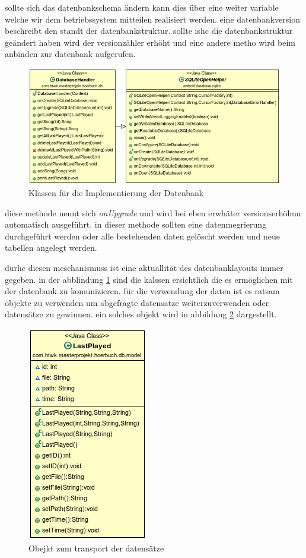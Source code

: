 sollte sich das datenbankschema ändern kann dies über eine weiter variable welche wir dem betriebssystem mitteilen realisiert werden. eine datenbankversion beschreibt den standt der datenbankstruktur. sollte ishc die datenbankstruktur geändert haben wird der versionzähler erhöht und eine andere metho wird beim anbinden zur datenbank aufgerufen.

\begin{center}
\begin{figure}
\includegraphics[scale=0.7]{images/database}
\caption{Klassen für die Implementierung der Datenbank}
\label{database}
\end{figure}
\end{center}

diese methode nennt sich \textit{onUpgrade} und wird bei eben erwhäter versionserhöhun automatisch ausgeführt. in dieser methode sollten eine datenmegrierung durchgeführt werden oder alle bestehenden daten gelöscht werden und neue tabellen angelegt werden.

durhc diesen meschanismuss ist eine aktuallität des datenbanklayouts immer gegeben. in der abblindung \ref{database} sind die kalssen ersichtlich die es ermöglichen mit der datenbank zu komunizieren. für die verwendung der daten ist es ratsam objekte zu verwenden um abgefragte datensatze weiterzuverwenden oder datensätze zu gewinnen. ein solches objekt wird in abbildung \ref{dbmodel} dargestellt.

\begin{center}
\begin{figure}
\includegraphics[scale=0.7]{images/dbmodel}
\caption{Obejkt zum transport der datensätze}
\label{dbmodel}
\end{figure}
\end{center}

